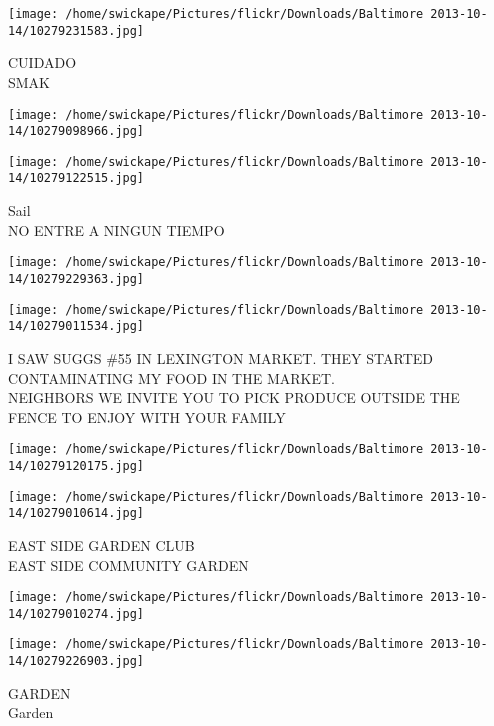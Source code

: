 \documentclass[10pt,letterpaper]{article}
\begin{document}
\vspace{0.25in}
\texttt{[image: /home/swickape/Pictures/flickr/Downloads/Baltimore 2013-10-14/10279231583.jpg]}

CUIDADO\\
SMAK\\
\pagebreak

\texttt{[image: /home/swickape/Pictures/flickr/Downloads/Baltimore 2013-10-14/10279098966.jpg]}

\vspace{0.25in}
\texttt{[image: /home/swickape/Pictures/flickr/Downloads/Baltimore 2013-10-14/10279122515.jpg]}

Sail\\
NO ENTRE A NINGUN TIEMPO\\
\pagebreak

\texttt{[image: /home/swickape/Pictures/flickr/Downloads/Baltimore 2013-10-14/10279229363.jpg]}

\vspace{0.25in}
\texttt{[image: /home/swickape/Pictures/flickr/Downloads/Baltimore 2013-10-14/10279011534.jpg]}

I SAW SUGGS \#55 IN LEXINGTON MARKET.  THEY STARTED CONTAMINATING MY FOOD IN THE MARKET.\\
NEIGHBORS WE INVITE YOU TO PICK PRODUCE OUTSIDE THE FENCE TO ENJOY WITH YOUR FAMILY\\
\pagebreak

\texttt{[image: /home/swickape/Pictures/flickr/Downloads/Baltimore 2013-10-14/10279120175.jpg]}

\vspace{0.25in}
\texttt{[image: /home/swickape/Pictures/flickr/Downloads/Baltimore 2013-10-14/10279010614.jpg]}

EAST SIDE GARDEN CLUB\\
EAST SIDE COMMUNITY GARDEN\\
\pagebreak

\texttt{[image: /home/swickape/Pictures/flickr/Downloads/Baltimore 2013-10-14/10279010274.jpg]}

\vspace{0.25in}
\texttt{[image: /home/swickape/Pictures/flickr/Downloads/Baltimore 2013-10-14/10279226903.jpg]}

GARDEN\\
Garden\\
\pagebreak
\end{document}
